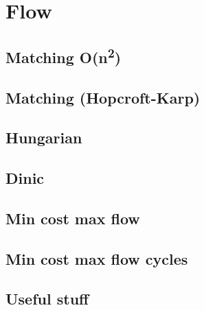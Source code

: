 \section{Flow}

\subsection{Matching O(n\textsuperscript{2})}

\subsection{Matching (Hopcroft-Karp)}

\subsection{Hungarian}

\subsection{Dinic}

\subsection{Min cost max flow}

\subsection{Min cost max flow cycles}

\subsection{Useful stuff}

